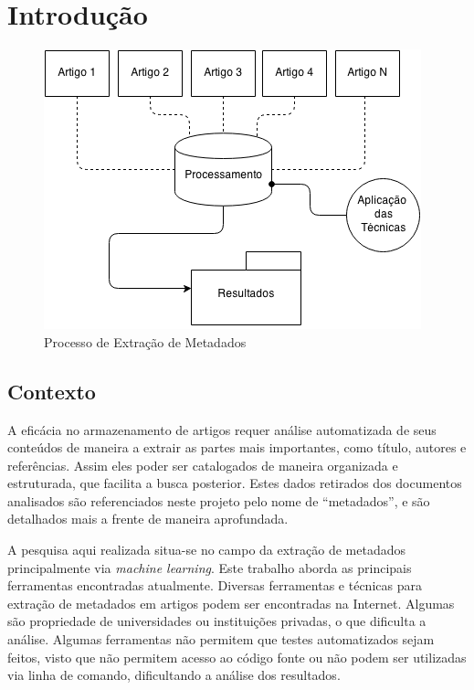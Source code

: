 
\chapter{Introdução}
\label{cha:introduction}


\begin{figure}
	\centering
	\caption{Processo de Extração de Metadados}
	\label{fig:introduction}
	\includegraphics[width=0.7\linewidth]{./assets/images/introduction}
\end{figure}

\section{Contexto}
\label{sec:context}

A eficácia no armazenamento de artigos requer análise automatizada de seus conteúdos de maneira a extrair as partes mais importantes, como título, autores e referências. Assim eles poder ser catalogados de maneira organizada e estruturada, que facilita a busca posterior. 
Estes dados retirados dos documentos analisados são referenciados neste projeto pelo nome de ``metadados'', e são detalhados mais a frente de maneira aprofundada.

A pesquisa aqui realizada situa-se no campo da extração de metadados principalmente via \textit{machine learning}. Este trabalho aborda as principais ferramentas encontradas atualmente. Diversas ferramentas e técnicas para extração de metadados em artigos podem ser encontradas na Internet. Algumas são propriedade de universidades ou instituições privadas, o que dificulta a análise. Algumas ferramentas não permitem que testes automatizados sejam feitos, visto que não permitem acesso ao código fonte ou não podem ser utilizadas via linha de comando, dificultando a análise dos resultados.

